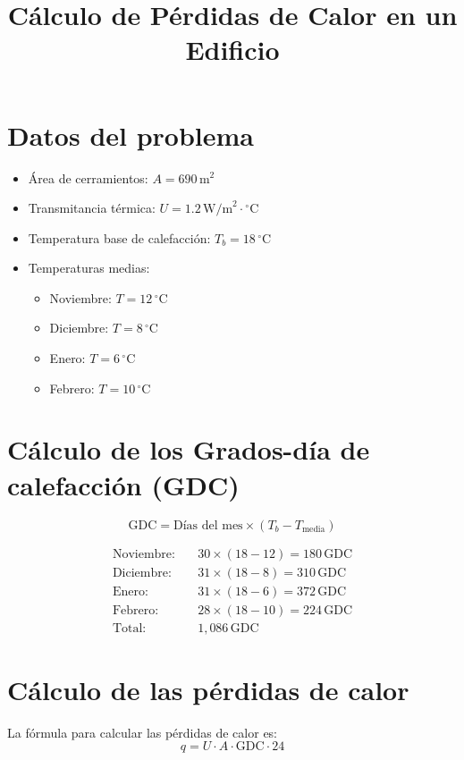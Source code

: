 \documentclass[a4paper,12pt]{article}
\begin{document}
\title{Cálculo de Pérdidas de Calor en un Edificio}
\author{}
\date{}
\maketitle

\section*{Datos del problema}
\begin{itemize}
    \item Área de cerramientos: \( A = 690 \, \text{m}^2 \)
    \item Transmitancia térmica: \( U = 1.2 \, \text{W/m}^2 \cdot {}^\circ\text{C} \)
    \item Temperatura base de calefacción: \( T_b = 18 \, {}^\circ\text{C} \)
    \item Temperaturas medias:
    \begin{itemize}
        \item Noviembre: \( T = 12 \, {}^\circ\text{C} \)
        \item Diciembre: \( T = 8 \, {}^\circ\text{C} \)
        \item Enero: \( T = 6 \, {}^\circ\text{C} \)
        \item Febrero: \( T = 10 \, {}^\circ\text{C} \)
    \end{itemize}
\end{itemize}

\section*{Cálculo de los Grados-día de calefacción (GDC)}
\[
\text{GDC} = \text{Días del mes} \times (T_b - T_{\text{media}})
\]

\begin{align*}
\text{Noviembre:} & \quad 30 \times (18 - 12) = 180 \, \text{GDC} \\
\text{Diciembre:} & \quad 31 \times (18 - 8) = 310 \, \text{GDC} \\
\text{Enero:} & \quad 31 \times (18 - 6) = 372 \, \text{GDC} \\
\text{Febrero:} & \quad 28 \times (18 - 10) = 224 \, \text{GDC} \\
\text{Total:} & \quad 1,086 \, \text{GDC}
\end{align*}

\section*{Cálculo de las pérdidas de calor}
La fórmula para calcular las pérdidas de calor es:
\[
q = U \cdot A \cdot \text{GDC} \cdot 24
\]
\end{document}
